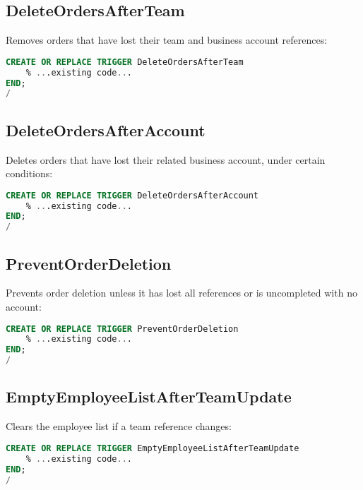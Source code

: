 \subsection*{DeleteOrdersAfterTeam}
Removes orders that have lost their team and business account references:
\begin{lstlisting}[language=SQL]
CREATE OR REPLACE TRIGGER DeleteOrdersAfterTeam
    % ...existing code...
END;
/
\end{lstlisting}

\subsection*{DeleteOrdersAfterAccount}
Deletes orders that have lost their related business account, under certain conditions:
\begin{lstlisting}[language=SQL]
CREATE OR REPLACE TRIGGER DeleteOrdersAfterAccount
    % ...existing code...
END;
/
\end{lstlisting}

\subsection*{PreventOrderDeletion}
Prevents order deletion unless it has lost all references or is uncompleted with no account:
\begin{lstlisting}[language=SQL]
CREATE OR REPLACE TRIGGER PreventOrderDeletion
    % ...existing code...
END;
/
\end{lstlisting}

\subsection*{EmptyEmployeeListAfterTeamUpdate}
Clears the employee list if a team reference changes:
\begin{lstlisting}[language=SQL]
CREATE OR REPLACE TRIGGER EmptyEmployeeListAfterTeamUpdate
    % ...existing code...
END;
/
\end{lstlisting}
